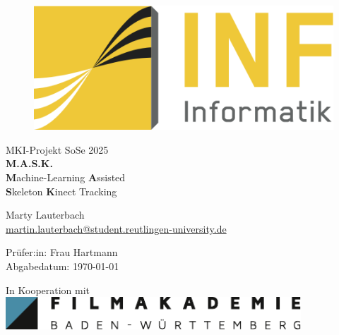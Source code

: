 \begin{titlepage}
	\begin{figure}
		\begin{flushright}
			\includegraphics[scale=0.75]{images/INFLogo.png}
		\end{flushright}
	\end{figure}
	
	{\centering
		
		\vspace{3.5cm}
		{\Large  MKI-Projekt SoSe 2025}\\
		\vspace{1cm}
		{\LARGE{\textbf{M.A.S.K.}} \\
        \vspace{0.5cm}
        \textbf{\color{Goldenrod}M}achine-Learning \textbf{\color{Goldenrod}A}ssisted \\
        \textbf{\color{Goldenrod}S}keleton \textbf{\color{Goldenrod}K}inect Tracking \\
        }
        
		\vspace{5cm}
		Marty Lauterbach\\
		\url{martin.lauterbach@student.reutlingen-university.de}\\
        \vspace{0.2cm}
        
		Prüfer:in: Frau Hartmann\\
		
		\vspace{0.2cm}
		{\small Abgabedatum: \today}\\

        \vspace{2.5cm}
        \begin{center}
        In Kooperation mit\\
        \vspace{0.3cm}
        \includegraphics[height=1.2cm]{images/FAWB.pdf}
        \end{center}
	}
	

\end{titlepage}
